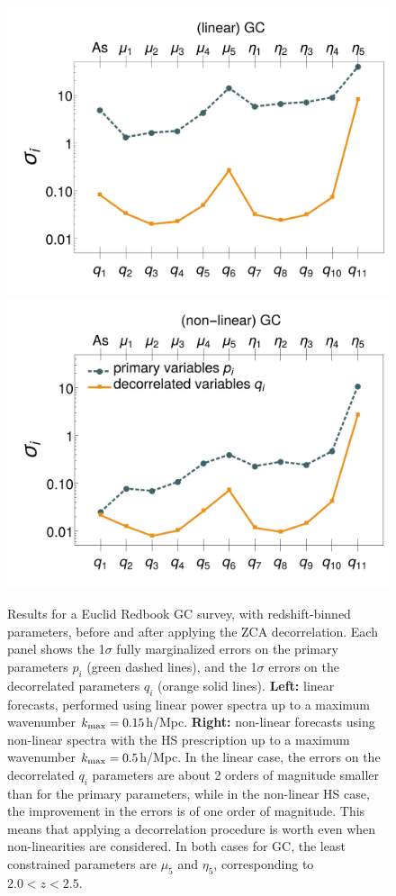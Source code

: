 \begin{figure}[htbp]
\centering{}\includegraphics[width=0.47\linewidth]{Chapters/linear-nonlinear-MG-forecasts/figures/Decorrelations-GC/Errors_at_par_index_i--_ZCA_SquareNorm--fiducialMGBin3_Euclid_GC_linearPK_}
\includegraphics[width=0.47\linewidth]{Chapters/linear-nonlinear-MG-forecasts/figures/Decorrelations-GC/Errors_at_par_index_i--_ZCA_SquareNorm--fiducialMGBin3_Euclid_GC_nonlinearPk__Zhao_}
\caption[1$\sigma$ forecasted errors on the primary and decorrelated parameters for Euclid GC.]{\label{fig:GCbinerrs}
Results for a Euclid Redbook GC survey, with redshift-binned parameters, before and after applying the ZCA decorrelation.
Each panel shows the 1$\sigma$ fully marginalized errors on the primary parameters $p_i$ (green dashed
lines), and the 1$\sigma$ errors on the decorrelated 
parameters $q_i$ (orange solid lines). \textbf{Left: } linear forecasts,
performed using linear power spectra up to a maximum wavenumber $k_{\rm max}=0.15$h/Mpc.
\textbf{Right: }non-linear forecasts using non-linear spectra with the HS prescription up to a maximum wavenumber $k_{\rm max}=0.5$h/Mpc.
In the linear case, the errors on the decorrelated $q_i$ parameters are about 2 orders of magnitude smaller than for the primary parameters, 
while in the non-linear HS case, the improvement in the errors is of one order of magnitude. This means that applying a decorrelation procedure is worth even when non-linearities are considered.
In both cases for GC, the least constrained parameters are $\mu_5$ and $\eta_5$, corresponding to $2.0 < z < 2.5$.}
\end{figure}


